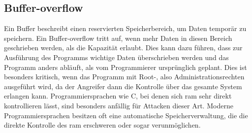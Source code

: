 \documentclass[11pt, a4paper]{article}
\begin{document}
\subsection{Buffer-overflow}\label{subsec:buffer-overflow}
Ein Buffer beschreibt einen reservierten Speicherbereich, um Daten temporär zu speichern. Ein Buffer-overflow tritt auf, wenn mehr Daten in diesen Bereich geschrieben werden, als die Kapazität erlaubt. Dies kann dazu führen, dass zur Ausführung des Programms wichtige Daten überschrieben werden und das Programm anders abläuft, als vom Programmierer ursprünglich geplant. Dies ist besonders kritisch, wenn das Programm mit Root-, also Administrationsrechten ausgeführt wird, da der Angreifer dann die Kontrolle über das gesamte System erlangen kann. Programmiersprachen wie C, bei denen sich \gls{ram} sehr direkt kontrollieren lässt, sind besonders anfällig für Attacken dieser Art. Moderne Programmiersprachen besitzen oft eine automatische Speicherverwaltung, die die direkte Kontrolle des \gls{ram} erschweren oder sogar verunmöglichen.
\end{document}
